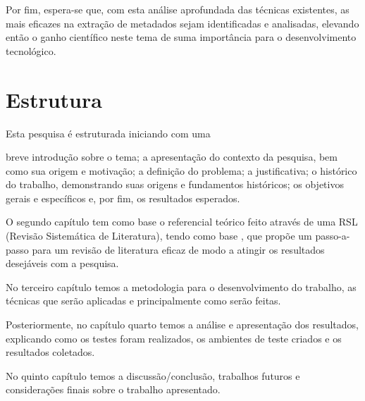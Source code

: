 \begin{textonovo}

Por fim, espera-se que, com esta análise aprofundada das técnicas existentes, as mais eficazes na extração de metadados sejam identificadas e analisadas, elevando então o ganho científico neste tema de suma importância para o desenvolvimento tecnológico.

\end{textonovo}

\section{Estrutura}

Esta pesquisa é estruturada iniciando com uma \begin{textoalterado} breve introdução sobre o tema; a apresentação do contexto da pesquisa, bem como sua origem e motivação; a definição do problema; a justificativa; o histórico do trabalho, demonstrando suas origens e fundamentos históricos; os objetivos gerais e específicos e, por fim, os resultados esperados.\end{textoalterado}

O segundo capítulo tem como base o referencial teórico feito através de uma RSL (Revisão Sistemática de Literatura), tendo como base \cite{Kitchenham}, que propõe um passo-a-passo para um revisão de literatura eficaz de modo a atingir os resultados desejáveis com a pesquisa.

No terceiro capítulo temos a metodologia para o desenvolvimento do trabalho, as técnicas que serão aplicadas e principalmente como serão feitas. \begin{textoalterado}Posteriormente, no capítulo quarto temos a análise e apresentação dos resultados, explicando como os testes foram realizados, os ambientes de teste criados e os resultados coletados.\end{textoalterado}

No quinto capítulo temos a discussão/conclusão, trabalhos futuros e considerações finais sobre o trabalho apresentado.



